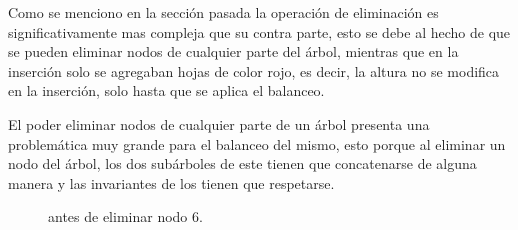 Como se menciono en la secci\'on pasada la operaci\'on de eliminaci\'on es significativamente mas
compleja que su contra parte, esto se debe al hecho de que se pueden eliminar nodos de cualquier
parte del \'arbol, mientras que en la inserci\'on solo se agregaban hojas de color rojo, es decir,
la altura no se modifica en la inserción\cite{RBTypes}, solo hasta que se aplica el balanceo.

El poder eliminar nodos de cualquier parte de un \'arbol presenta una problemática muy grande para
el balanceo del mismo, esto porque al eliminar un nodo del \'arbol, los dos subárboles de este
tienen que concatenarse de alguna manera y las invariantes de los {\arns} tienen que respetarse.

\begin{figure}
\centering
\captionsetup{justification=centering}
\caption{{\Arn antes de eliminar nodo 6.}}
\label{arbolRB_4}
\end{figure}

